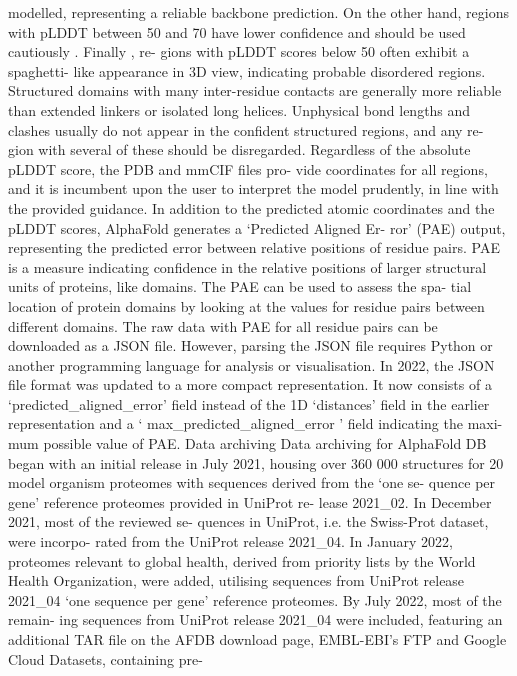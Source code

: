 modelled, representing a reliable backbone prediction. On the
other hand, regions with pLDDT between 50 and 70 have
lower confidence and should be used cautiously . Finally , re-
gions with pLDDT scores below 50 often exhibit a spaghetti-
like appearance in 3D view, indicating probable disordered
regions. Structured domains with many inter-residue contacts
are generally more reliable than extended linkers or isolated
long helices. Unphysical bond lengths and clashes usually do
not appear in the confident structured regions, and any re-
gion with several of these should be disregarded. Regardless
of the absolute pLDDT score, the PDB and mmCIF files pro-
vide coordinates for all regions, and it is incumbent upon the
user to interpret the model prudently, in line with the provided
guidance.
In addition to the predicted atomic coordinates and the
pLDDT scores, AlphaFold generates a ‘Predicted Aligned Er-
ror’ (PAE) output, representing the predicted error between
relative positions of residue pairs. PAE is a measure indicating
confidence in the relative positions of larger structural units of
proteins, like domains. The PAE can be used to assess the spa-
tial location of protein domains by looking at the values for
residue pairs between different domains. The raw data with
PAE for all residue pairs can be downloaded as a JSON file.
However, parsing the JSON file requires Python or another
programming language for analysis or visualisation.
In 2022, the JSON file format was updated to
a more compact representation. It now consists of
a ‘predicted\_aligned\_error’ field instead of the 1D
‘distances’ field in the earlier representation and a
‘ max\_predicted\_aligned\_error ’ field indicating the maxi-
mum possible value of PAE.
Data archiving
Data archiving for AlphaFold DB began with an initial release
in July 2021, housing over 360 000 structures for 20 model
organism proteomes with sequences derived from the ‘one se-
quence per gene’ reference proteomes provided in UniProt re-
lease 2021\_02. In December 2021, most of the reviewed se-
quences in UniProt, i.e. the Swiss-Prot dataset, were incorpo-
rated from the UniProt release 2021\_04. In January 2022,
proteomes relevant to global health, derived from priority
lists by the World Health Organization, were added, utilising
sequences from UniProt release 2021\_04 ‘one sequence per
gene’ reference proteomes. By July 2022, most of the remain-
ing sequences from UniProt release 2021\_04 were included,
featuring an additional TAR file on the AFDB download page,
EMBL-EBI’s FTP and Google Cloud Datasets, containing pre-
